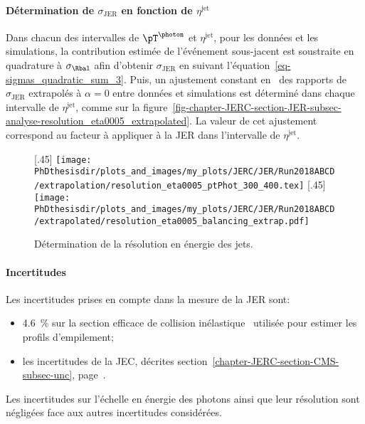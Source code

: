 \paragraph{Détermination de $\sigma_\text{JER}$ en fonction de $\eta^\text{jet}$}
Dans chacun des intervalles de $\pT^{\photon}$ et $\eta^\text{jet}$, pour les données et les simulations, la contribution estimée de l'événement sous-jacent est soustraite en quadrature à $\sigma_{\Rbal}$ afin d'obtenir $\sigma_\text{JER}$ en suivant l'équation~\eqref{eq-sigmas_quadratic_sum_3}.
Puis, un ajustement constant en \pT\ des rapports de $\sigma_\text{JER}$ extrapolés à $\alpha=0$ entre données et simulations est déterminé dans chaque intervalle de $\eta^\text{jet}$, comme sur la figure~\ref{fig-chapter-JERC-section-JER-subsec-analyse-resolution_eta0005_extrapolated}.
La valeur de cet ajustement correspond au facteur à appliquer à la JER dans l'intervalle de $\eta^\text{jet}$.
\begin{figure}[h]
\centering
{}[.45\textwidth]
{\texttt{[image: \\PhDthesisdir/plots\_and\_images/my\_plots/JERC/JER/Run2018ABCD/extrapolation/resolution\_eta0005\_ptPhot\_300\_400.tex]}}
\hfill
{}[.45\textwidth]
{\texttt{[image: \\PhDthesisdir/plots\_and\_images/my\_plots/JERC/JER/Run2018ABCD/extrapolated/resolution\_eta0005\_balancing\_extrap.pdf]}}

\caption{Détermination de la résolution en énergie des jets.}
\end{figure}
\paragraph{Incertitudes}
Les incertitudes prises en compte dans la mesure de la JER sont:
\begin{itemize}
\item \SI{4.6}{\%} sur la section efficace de collision inélastique \proton\proton\ utilisée pour estimer les profils d'empilement;
\item les incertitudes de la JEC, décrites section~\ref{chapter-JERC-section-CMS-subsec-unc}, page~\pageref{chapter-JERC-section-CMS-subsec-unc}.
\end{itemize}
Les incertitudes sur l'échelle en énergie des photons ainsi que leur résolution sont négligées face aux autres incertitudes considérées.
